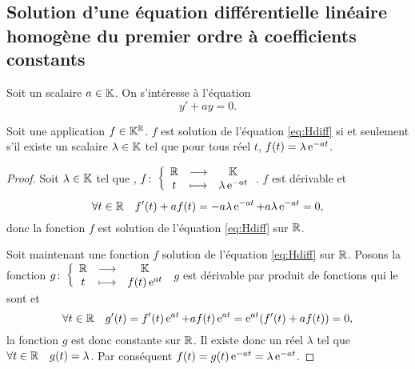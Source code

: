\subsection[Solution équation homogène coefficients constants]{Solution d'une équation différentielle linéaire homogène du premier ordre à coefficients constants}
\label{subsec:solutioneqdifflinhomog1coefconstants}
Soit un scalaire $a \in \mathbb{K}$. On s'intéresse à l'équation 
\begin{equation}
\label{eq:Hdiff}
y'+ay=0.
\end{equation}
%
\begin{theo}
\label{theo:1}
Soit une application $f \in \mathbb{K}^{\mathbb{R}}$. $f$ est solution de l'équation \eqref{eq:Hdiff} si et seulement s'il existe un scalaire $\lambda \in \mathbb{K}$ tel que pour tous réel $t$, $f(t)=\lambda \operatorname{e}^{-at}$.
\end{theo}
\begin{proof}
Soit $\lambda \in \mathbb{K}$ tel que , $f\colon \left\{\begin{array}{ccc} \mathbb{R} & \longrightarrow &\mathbb{K}\\ t & \longmapsto & \lambda \operatorname{e}^{-at} \end{array} \right.$. $f$ est dérivable et
\begin{equation}
\forall t \in \mathbb{R} \quad f'(t)+af(t)=-a \lambda \operatorname{e}^{-at}+a \lambda \operatorname{e}^{-at}=0,
\end{equation}
donc la fonction $f$ est solution de l'équation \eqref{eq:Hdiff} sur $\mathbb{R}$. 

Soit maintenant une fonction $f$ solution de l'équation \eqref{eq:Hdiff} sur $\mathbb{R}$. Posons la fonction $g\colon \left\{\begin{array}{ccc} \mathbb{R} & \longrightarrow &\mathbb{K}\\ t & \longmapsto & f(t)\operatorname{e}^{at} \end{array} \right.$ $g$ est dérivable par produit de fonctions qui le sont et
\begin{equation}
\forall t \in \mathbb{R} \quad g'(t)=f'(t)\operatorname{e}^{at} + af(t)\operatorname{e}^{at}=\operatorname{e}^{at}(f'(t)+af(t))=0,
\end{equation}
la fonction $g$ est donc constante sur $\mathbb{R}$. Il existe donc un réel $\lambda$ tel que $\forall t \in \mathbb{R} \quad g(t)=\lambda$. Par conséquent $f(t)=g(t)\operatorname{e}^{-at}=\lambda \operatorname{e}^{-at}$.
\end{proof}

